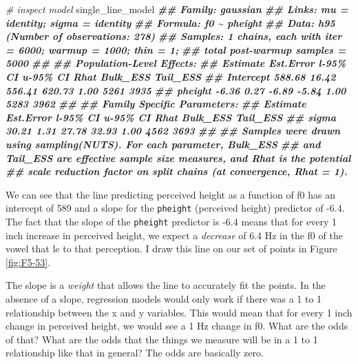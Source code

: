 \documentclass[
]{book}
\newenvironment{Shaded}{\begin{snugshade}}{\end{snugshade}}
\newcommand{\CommentTok}[1]{\textcolor[rgb]{0.56,0.35,0.01}{\textit{#1}}}
\newcommand{\DocumentationTok}[1]{\textcolor[rgb]{0.56,0.35,0.01}{\textbf{\textit{#1}}}}
\newcommand{\NormalTok}[1]{#1}
\begin{document}
\begin{Shaded}
\begin{Highlighting}[]
\CommentTok{\# inspect model}
\NormalTok{single\_line\_model}
\DocumentationTok{\#\#  Family: gaussian }
\DocumentationTok{\#\#   Links: mu = identity; sigma = identity }
\DocumentationTok{\#\# Formula: f0 \textasciitilde{} pheight }
\DocumentationTok{\#\#    Data: h95 (Number of observations: 278) }
\DocumentationTok{\#\# Samples: 1 chains, each with iter = 6000; warmup = 1000; thin = 1;}
\DocumentationTok{\#\#          total post{-}warmup samples = 5000}
\DocumentationTok{\#\# }
\DocumentationTok{\#\# Population{-}Level Effects: }
\DocumentationTok{\#\#           Estimate Est.Error l{-}95\% CI u{-}95\% CI Rhat Bulk\_ESS Tail\_ESS}
\DocumentationTok{\#\# Intercept   588.68     16.42   556.41   620.73 1.00     5261     3935}
\DocumentationTok{\#\# pheight      {-}6.36      0.27    {-}6.89    {-}5.84 1.00     5283     3962}
\DocumentationTok{\#\# }
\DocumentationTok{\#\# Family Specific Parameters: }
\DocumentationTok{\#\#       Estimate Est.Error l{-}95\% CI u{-}95\% CI Rhat Bulk\_ESS Tail\_ESS}
\DocumentationTok{\#\# sigma    30.21      1.31    27.78    32.93 1.00     4562     3693}
\DocumentationTok{\#\# }
\DocumentationTok{\#\# Samples were drawn using sampling(NUTS). For each parameter, Bulk\_ESS}
\DocumentationTok{\#\# and Tail\_ESS are effective sample size measures, and Rhat is the potential}
\DocumentationTok{\#\# scale reduction factor on split chains (at convergence, Rhat = 1).}
\end{Highlighting}
\end{Shaded}

We can see that the line predicting perceived height as a function of f0 has an intercept of 589 and a slope for the \texttt{pheight} (perceived height) predictor of -6.4. The fact that the slope of the \texttt{pheight} predictor is -6.4 means that for every 1 inch increase in perceived height, we expect a \emph{decrease} of 6.4 Hz in the f0 of the vowel that le to that perception. I draw this line on our set of points in Figure \ref{fig:F5-53}.

The slope is a \emph{weight} that allows the line to accurately fit the points. In the absence of a slope, regression models would only work if there was a 1 to 1 relationship between the x and y variables. This would mean that for every 1 inch change in perceived height, we would see a 1 Hz change in f0. What are the odds of that? What are the odds that the things we measure will be in a 1 to 1 relationship like that in general? The odds are basically zero.
\end{document}
